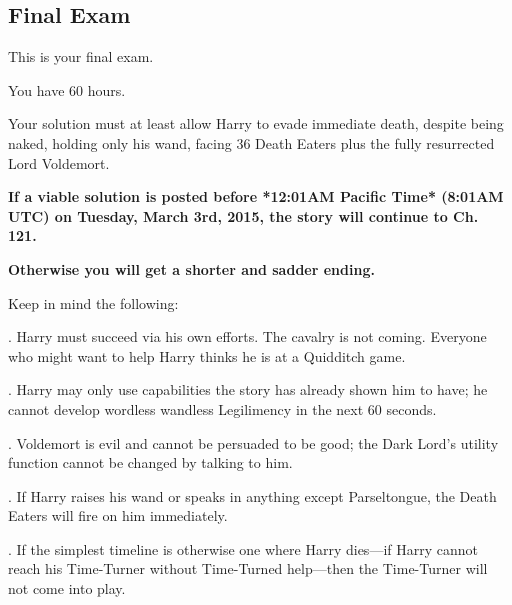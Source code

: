 \subsection{\textbf{Final Exam}}

\noindent
This is your final exam.

\vspace*{.5\baselineskip}\noindent
You have 60 hours.

\vspace*{.5\baselineskip}\noindent
Your solution must at least allow Harry to evade immediate death,
despite being naked, holding only his wand, facing 36 Death Eaters
plus the fully resurrected Lord Voldemort.

\vspace*{.5\baselineskip}\noindent
\textbf{If a viable solution is posted before
*12:01AM Pacific Time* (8:01AM UTC) on Tuesday, March 3rd, 2015,
the story will continue to Ch. 121.}

\vspace*{.5\baselineskip}\noindent
\textbf{Otherwise you will get a shorter and sadder ending.}

\vspace*{.5\baselineskip}\noindent
Keep in mind the following:

\vspace*{.5\baselineskip}. Harry must succeed via his own efforts. The cavalry is not coming.
Everyone who might want to help Harry thinks he is at a Quidditch game.

\vspace*{.5\baselineskip}. Harry may only use capabilities the story has already shown him to
have;
he cannot develop wordless wandless Legilimency in the next 60 seconds.

\vspace*{.5\baselineskip}. Voldemort is evil and cannot be persuaded to be good;
the Dark Lord's utility function cannot be changed by talking to him.

\vspace*{.5\baselineskip}. If Harry raises his wand or speaks in anything except Parseltongue,
the Death Eaters will fire on him immediately.

\vspace*{.5\baselineskip}. If the simplest timeline is otherwise one where Harry dies—if 
Harry cannot reach his Time-Turner without Time-Turned help—then 
the Time-Turner will not come into play.

